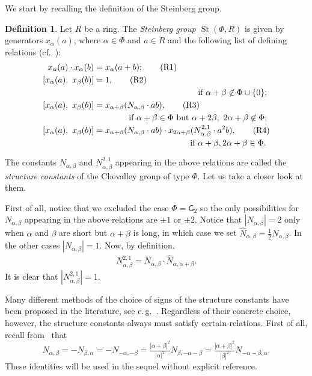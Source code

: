 \documentclass[oneside, 11pt]{amsart}
\numberwithin{equation}{section}
\theoremstyle{definition}
\newtheorem{df}[lemma]{Definition} \Crefname{df}{Definition}{Definitions}
\theoremstyle{remark}
\DeclareMathOperator\St{St}
\begin{document}
We start by recalling the definition of the Steinberg group.
\begin{df} \label{def:Steinberg}
Let $R$ be a ring. The {\it Steinberg group $\St(\Phi, R)$} is given by generators $x_\alpha(a)$, where $\alpha \in \Phi$ and $a \in R$ and the following list of defining relations (cf.~\cite{Re75}):
\begin{align}
 x_\alpha(a) \cdot x_\alpha(b)    &= x_\alpha(a+b); \tag{R1} \label{R1} \\
 [x_\alpha(a),\ x_\beta(b)] &= 1, \tag{R2} \label{R2} \\ 
 \multispan2{\hfil if $\alpha + \beta \not\in\Phi \cup \{0\};$} \nonumber \\
 [x_\alpha(a),\ x_\beta(b)] &= x_{\alpha + \beta}(N_{\alpha,\beta} \cdot ab), \tag{R3} \label{R3} \\
 \multispan2{\hfill if $\alpha+\beta\in\Phi$ but $\alpha+2\beta,\ 2\alpha+\beta\not\in\Phi;$} \nonumber \\
 [x_\alpha(a),\ x_\beta(b)] &= x_{\alpha + \beta}(N_{\alpha,\beta} \cdot ab) \cdot x_{2\alpha+\beta}(N_{\alpha,\beta}^{2,1} \cdot a^2b), \tag{R4} \label{R4} \\ \multispan2{ \hfill if $\alpha+\beta,2\alpha+\beta\in\Phi$.} \nonumber  \end{align}
\end{df}
The constants $N_{\alpha,\beta}$ and $N_{\alpha,\beta}^{2,1}$ appearing in the above relations are called the {\it structure constants} of the Chevalley group of type $\Phi$. Let us take a closer look at them.

First of all, notice that we excluded the case $\Phi=\mathsf{G}_2$ so the only possibilities for $N_{\alpha, \beta}$ appearing in the above relations are $\pm 1$ or $\pm 2$.
Notice that $|N_{\alpha,\beta}| = 2$ only when $\alpha$ and $\beta$ are short but $\alpha+\beta$ is long, in which case we set $\widehat{N}_{\alpha, \beta} = \frac{1}{2} N_{\alpha, \beta}$.
In the other cases $|N_{\alpha, \beta}| = 1$.
Now, by definition, 
\begin{align}
\label{eq:N21def}
N_{\alpha,\beta}^{2,1} = N_{\alpha,\beta} \cdot \widehat{N}_{\alpha, \alpha+\beta}.
\end{align}
It is clear that $|N_{\alpha,\beta}^{2,1}|=1$.

Many different methods of the choice of signs of the structure constants have been proposed in the literature, see e.\,g.~\cite{VP}. 
Regardless of their concrete choice, however, the structure constants always must satisfy certain relations. First of all, recall from~\cite[\S~14]{VP} that
\begin{equation} \label{eq:sc-ids-sl} N_{\alpha, \beta} = -N_{\beta,\alpha} = - N_{-\alpha, -\beta} = \tfrac{|\alpha+\beta|^2}{|\alpha|^2} N_{\beta, -\alpha-\beta} = \tfrac{|\alpha+\beta|^2}{|\beta|^2} N_{-\alpha-\beta, \alpha}. \end{equation}
These identities will be used in the sequel without explicit reference. 
\end{document}
